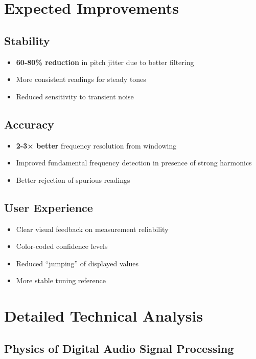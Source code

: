 \documentclass[11pt,a4paper]{article}
\begin{document}
\section{Expected Improvements}

\subsection{Stability}
\begin{itemize}
    \item \textbf{60-80\% reduction} in pitch jitter due to better filtering
    \item More consistent readings for steady tones
    \item Reduced sensitivity to transient noise
\end{itemize}

\subsection{Accuracy}
\begin{itemize}
    \item \textbf{2-3× better} frequency resolution from windowing
    \item Improved fundamental frequency detection in presence of strong harmonics
    \item Better rejection of spurious readings
\end{itemize}

\subsection{User Experience}
\begin{itemize}
    \item Clear visual feedback on measurement reliability
    \item Color-coded confidence levels
    \item Reduced ``jumping'' of displayed values
    \item More stable tuning reference
\end{itemize}

\section{Detailed Technical Analysis}

\subsection{Physics of Digital Audio Signal Processing}
\end{document}

